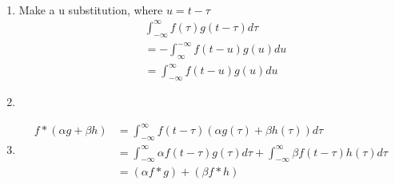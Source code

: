 \documentclass[letterpaper,12pt]{article}
\theoremstyle{definition}
\begin{document}
\\
\begin{enumerate}
    \item 
        Make a u substitution, where $u = t - \tau$
        \begin{align*}
            &\int^\infty_{-\infty} f(\tau)g(t-\tau)d\tau \\
            & = -\int^{-\infty}_\infty f(t-u)g(u) du \\
            & = \int^\infty_{-\infty} f(t-u)g(u) du
        \end{align*}
    \item
    \item
    \begin{align*}
    f*(\alpha g + \beta h) &= \int^{\infty}_{-\infty} f(t - \tau) (\alpha g(\tau) + \beta h(\tau)) d\tau \\
    &= \int^{\infty}_{-\infty} \alpha f(t - \tau) g(\tau) d\tau + \int^{\infty}_{-\infty} \beta f(t - \tau) h(\tau) d\tau \\
    &= (\alpha f * g) + (\beta f * h)    
    \end{align*}
\end{enumerate}

\\
\end{document}
